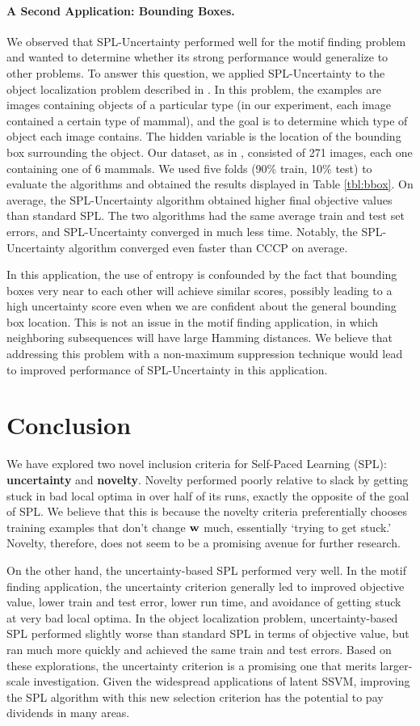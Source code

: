 \documentclass{article}
\newcommand{\mysection}[1]{\vspace{-4mm}\section{#1}\vspace{-4mm}}
\begin{document}
\paragraph{A Second Application: Bounding Boxes.} We observed that SPL-Uncertainty performed well for the motif finding problem and wanted to determine whether its strong performance would generalize to other problems. To answer this question, we applied SPL-Uncertainty to the object localization problem described in \cite{SPL}. In this problem, the examples are images containing objects of a particular type (in our experiment, each image contained a certain type of mammal), and the goal is to determine which type of object each image contains. The hidden variable is the location of the bounding box surrounding the object. Our dataset, as in \cite{SPL}, consisted of 271 images, each one containing one of 6 mammals. We used five folds (90\% train, 10\% test) to evaluate the algorithms and obtained the results displayed in Table \ref{tbl:bbox}. On average, the SPL-Uncertainty algorithm obtained higher final objective values than standard SPL. The two algorithms had the same average train and test set errors, and SPL-Uncertainty converged in much less time. Notably, the SPL-Uncertainty algorithm converged even faster than CCCP on average.

In this application, the use of entropy is confounded by the fact that bounding boxes very near to each other will achieve similar scores, possibly leading to a high uncertainty score even when we are confident about the general bounding box location. This is not an issue in the motif finding application, in which neighboring subsequences will have large Hamming distances.  We believe that addressing this problem with a non-maximum suppression technique would lead to improved performance of SPL-Uncertainty in this application. 

\mysection{Conclusion}
\label{sec:conclusion}

We have explored two novel inclusion criteria for Self-Paced Learning ({\sc SPL}): \textbf{uncertainty} and \textbf{novelty}. Novelty performed poorly relative to slack by getting stuck in bad local optima in over half of its runs, exactly the opposite of the goal of SPL. We believe that this is because the novelty criteria preferentially chooses training examples that don't change $\bf w$ much, essentially `trying to get stuck.' Novelty, therefore, does not seem to be a promising avenue for further research.

On the other hand, the uncertainty-based SPL performed very well. In the motif finding application, the uncertainty criterion generally led to improved objective value, lower train and test error, lower run time, and avoidance of getting stuck at very bad local optima. In the object localization problem, uncertainty-based SPL performed slightly worse than standard SPL in terms of objective value, but ran much more quickly and achieved the same train and test errors. Based on these explorations, the uncertainty criterion is a promising one that merits larger-scale investigation. Given the widespread applications of latent SSVM, improving the SPL algorithm with this new selection criterion has the potential to pay dividends in many areas. 
\end{document}
